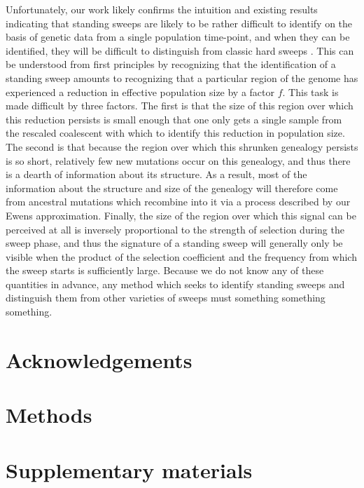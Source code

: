 \documentclass[a4paper,10pt]{article}
\begin{document}
Unfortunately, our work likely confirms the intuition and existing results indicating that standing sweeps are likely to be rather difficult to identify on the basis of genetic data from a single population time-point, and when they can be identified, they will be difficult to distinguish from classic hard sweeps \cite{Peter:2012ht}. This can be understood from first principles by recognizing that the identification of a standing sweep amounts to recognizing that a particular region of the genome has experienced a reduction in effective population size by a factor $f$. This task is made difficult by three factors. The first is that the size of this region over which this reduction persists is small enough that one only gets a single sample from the rescaled coalescent with which to identify this reduction in population size. The second is that because the region over which this shrunken genealogy persists is so short, relatively few new mutations occur on this genealogy, and thus there is a dearth of information about its structure. As a result, most of the information about the structure and size of the genealogy will therefore come from ancestral mutations which recombine into it via a process described by our Ewens approximation. Finally, the size of the region over which this signal can be perceived at all is inversely proportional to the strength of selection during the sweep phase, and thus the signature of a standing sweep will generally only be visible when the product of the selection coefficient and the frequency from which the sweep starts is sufficiently large. Because we do not know any of these quantities in advance, any method which seeks to identify standing sweeps and distinguish them from other varieties of sweeps must something something something.


\section{Acknowledgements}

\section{Methods}





\section{Supplementary materials}
\end{document}
